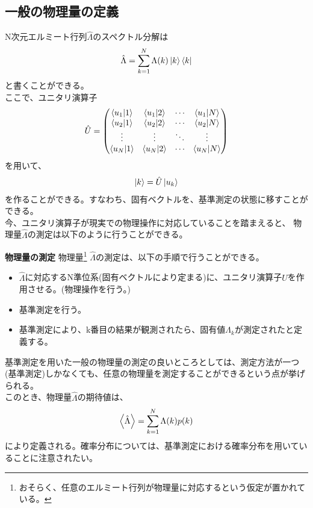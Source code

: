\documentclass[a4paper,11pt]{jsarticle}
\begin{document}
\subsection{一般の物理量の定義}
N次元エルミート行列$\hat{\Lambda}$のスペクトル分解は
\begin{align}
    \hat{\Lambda} = \sum_{k=1}^{N} \Lambda(k) \ket{k}\bra{k}
\end{align}
と書くことができる。\\
ここで、ユニタリ演算子
\begin{align}
    \hat U = 
    \begin{pmatrix}
    \braket{u_1}{1} & \braket{u_1}{2} & \cdots & \braket{u_1}{N} \\
    \braket{u_2}{1} & \braket{u_2}{2} & \cdots & \braket{u_2}{N} \\
    \vdots & \vdots & \ddots & \vdots \\
    \braket{u_N}{1} & \braket{u_N}{2} & \cdots & \braket{u_N}{N} \\
    \end{pmatrix}
\end{align}
を用いて、
\begin{align}
    \ket{k} = \hat{U} \ket{u_k}
\end{align}
を作ることができる。すなわち、固有ベクトルを、基準測定の状態に移すことができる。\\
今、ユニタリ演算子が現実での物理操作に対応していることを踏まえると、
物理量$\hat{\Lambda}$の測定は以下のように行うことができる。
\begin{itembox}[l]{\textbf{物理量の測定}}
    物理量\footnote{おそらく、任意のエルミート行列が物理量に対応するという仮定が置かれている。}
    $\hat{\Lambda}$の測定は、以下の手順で行うことができる。
    \begin{itemize}
        \item $\hat{\Lambda}$に対応するN準位系(固有ベクトルにより定まる)に、ユニタリ演算子$\hat{U}$を作用させる。(物理操作を行う。)
        \item 基準測定を行う。
        \item 基準測定により、k番目の結果が観測されたら、固有値$\Lambda_k$が測定されたと定義する。
    \end{itemize}
\end{itembox}
基準測定を用いた一般の物理量の測定の良いところとしては、測定方法が一つ(基準測定)しかなくても、任意の物理量を測定することができるという点が挙げられる。\\
このとき、物理量$\hat{\Lambda}$の期待値は、
\begin{align}
    \ev{\hat{\Lambda}} = \sum_{k=1}^{N} \Lambda(k) p(k)
\end{align}
により定義される。確率分布については、基準測定における確率分布を用いていることに注意されたい。\\
\end{document}
